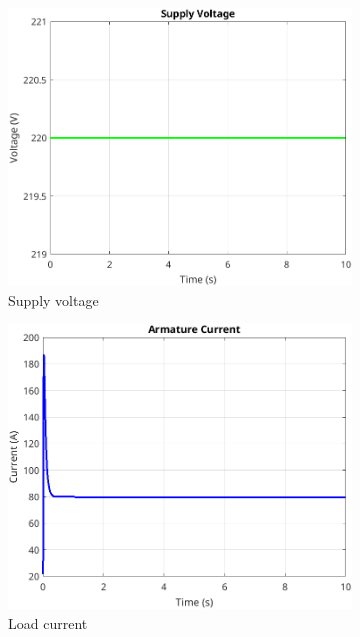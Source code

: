 \documentclass[a4paper,12pt]{article}
\begin{document}
\begin{figure}[h]
\centering
\begin{subfigure}{0.45\textwidth}
\includegraphics[width=\textwidth]{code/supl.png}
\caption{Supply voltage}
\end{subfigure}
\begin{subfigure}{0.45\textwidth}
\includegraphics[width=\textwidth]{code/Ia.png}
\caption{Load current}
\end{subfigure}
\begin{subfigure}{0.45\textwidth}

\end{subfigure}
\end{figure}
\end{document}
